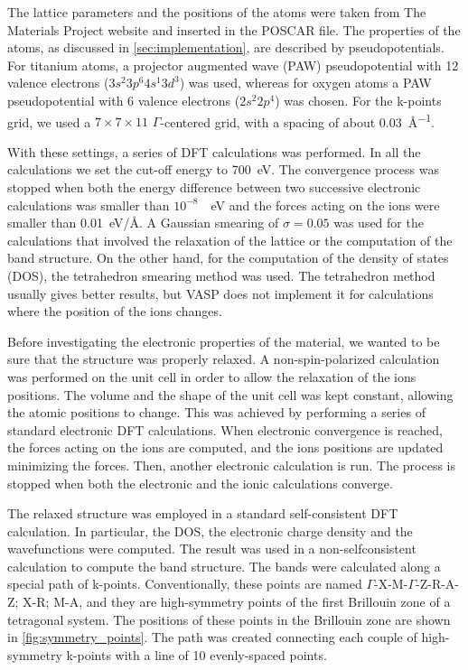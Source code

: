 The lattice parameters and the positions of the atoms were taken from The Materials Project website \cite{osti_1184648} and inserted in the  POSCAR file. The properties of the atoms, as discussed in \cref{sec:implementation}, are described by  pseudopotentials. For titanium atoms, a projector augmented wave (PAW) pseudopotential with 12 valence electrons ($3s^2 3p^6 4s^1 3d^3$) was used, whereas for oxygen atoms a PAW pseudopotential with 6 valence electrons ($2s^2 2p^4$) was chosen. For the k-points grid, we used a $7\times7\times11$ $\Gamma$-centered grid, with a spacing of about \SI{0.03}{\angstrom^{-1}}.

With these settings, a series of DFT calculations was performed. In all the calculations we set the cut-off energy to \SI{700}{eV}. The convergence process was stopped when both the energy difference between two successive electronic calculations was smaller than $10^{-8}$~\SI{}{eV} and the forces acting on the ions were smaller than \SI{0.01}{eV/\angstrom}. A Gaussian smearing of $\sigma = 0.05$ was used for the calculations that involved the relaxation of the lattice or the computation of the band structure. On the other hand, for the computation of the density of states (DOS), the tetrahedron smearing method was used. The tetrahedron method usually gives better results, but VASP does not implement it for calculations where the position of the ions changes.%

Before investigating the electronic properties of the material, we wanted to be sure that the structure was properly relaxed. A non-spin-polarized calculation was performed on the unit cell in order to allow the relaxation of the ions positions. The volume and the shape of the unit cell was kept constant, allowing the atomic positions to change. This was achieved by performing a series of standard electronic DFT calculations. When electronic convergence is reached, the forces acting on the ions are computed, and the ions positions are updated minimizing the forces. Then, another electronic calculation is run. The process is stopped when both the electronic and the ionic calculations converge.

The relaxed structure was employed in a standard self-consistent DFT calculation. In particular, the DOS, the electronic charge density and the wavefunctions were computed. The result was used in a non-selfconsistent calculation to compute the band structure. The bands were calculated along a special path of k-points. Conventionally, these points are named  $\Gamma$-X-M-$\Gamma$-Z-R-A-Z; X-R; M-A, and they are high-symmetry points of the first Brillouin zone of a tetragonal system. The positions of these points in the Brillouin zone are shown in \cref{fig:symmetry_points}. The path was created connecting each couple of high-symmetry k-points with a line of 10 evenly-spaced points.

